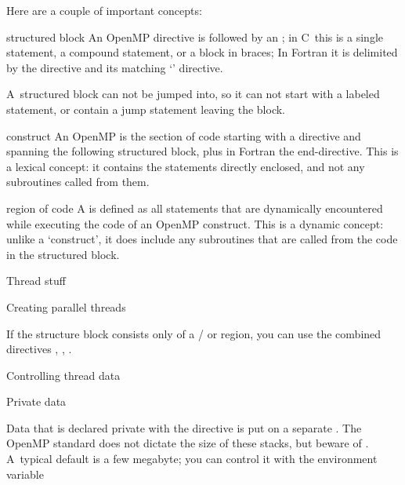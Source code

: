 Here are a couple of important concepts:
\begin{definition}
\item[structured block] An OpenMP directive is followed by an
  ; in C~this is a single statement, a
  compound statement, or a block in braces; In Fortran it is
  delimited by the directive and its matching `' directive.

  A~structured block can not be jumped into, so it can not start with a
  labeled statement, or contain a jump statement leaving the block.
\item[construct] An OpenMP  is the section of code
  starting with a directive and spanning the following structured block,
  plus in Fortran the end-directive. This is a lexical concept: it contains
  the statements directly enclosed, and not any subroutines called from them.
\item[region of code] A  is defined as all statements
  that are dynamically encountered while executing the code of an OpenMP construct.
  This is a dynamic concept: unlike a `construct', it does include any subroutines
  that are called from the code in the structured block.
\end{definition}

 {Thread stuff}

 {Creating parallel threads}


If the structure block consists only of a / or  region,
you can use the combined directives
,
,
.

 {Controlling thread data}


 {Private data}

Data that is declared private with the  directive is
put on a separate . The OpenMP standard
does not dictate the size of these stacks, but beware of .
A~typical default
is a few megabyte; you can control it with the environment variable


